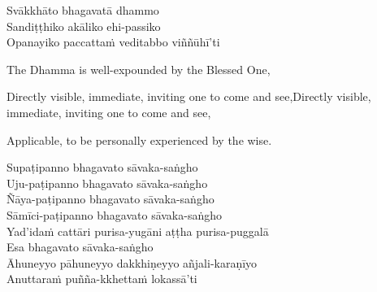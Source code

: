 \ifninebythirteen\clearpage\fi

\begin{pali-hang-continued}
  Svākkhāto bhagavatā dhammo\\
  Sandiṭṭhiko akāliko ehi-passiko\\
  Opanayiko paccattaṁ veditabbo viññūhī'ti
\end{pali-hang-continued}

\begin{english-verses}
  The Dhamma is well-expounded by the Blessed One,\\
  \begin{english-hang-together}
  \ifninebythirteen Directly visible, immediate, inviting one to  come and see,\else Directly visible, immediate, inviting one to  come and see,\fi\\
  \end{english-hang-together}
  Applicable, to be personally experienced by the wise.
\end{english-verses}

\ifbfive\clearpage\fi

\begin{pali-hang-continued}
  Supaṭipanno bhagavato sāvaka-saṅgho\\
  Uju-paṭipanno bhagavato sāvaka-saṅgho\\
  Ñāya-paṭipanno bhagavato sāvaka-saṅgho\\
  Sāmīci-paṭipanno bhagavato sāvaka-saṅgho\\
  Yad'idaṁ cattāri purisa-yugāni aṭṭha purisa-puggalā\\
  Esa bhagavato sāvaka-saṅgho\\
  Āhuneyyo pāhuneyyo dakkhiṇeyyo añjali-karaṇīyo\\
  Anuttaraṁ puñña-kkhettaṁ lokassā'ti
\end{pali-hang-continued}

